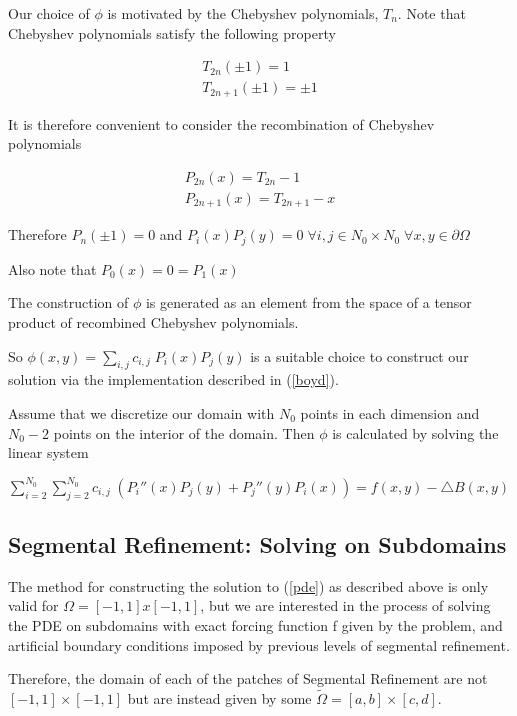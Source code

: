 \documentclass[final]{siamart1116}
\numberwithin{theorem}{section}
\begin{document}
Our choice of $\phi$ is motivated by the Chebyshev polynomials, $T_n$. Note that Chebyshev polynomials satisfy the following property

\begin{align*}
T_{2n}(\pm 1) = 1 \\
T_{2n+1}(\pm 1) = \pm 1
\end{align*}

It is therefore convenient to consider the recombination of Chebyshev polynomials

\begin{align*}
P_{2n}(x) = T_{2n} - 1 \\
P_{2n+1}(x) =  T_{2n+1} - x 
\end{align*}

Therefore $P_{n}(\pm 1) = 0$ and $P_i (x) P_j(y) = 0 \;  \forall  i, j \in N_0 \times N_0 \; \forall x, y \in \partial \Omega $

Also note that $P_0(x) = 0 = P_1(x)$

The construction of $\phi$ is generated as an element from the space of a tensor product of recombined Chebyshev polynomials. 

So $\phi(x, y) = \sum_{i, j} c_{i, j} \; P_i (x) P_j(y) $ is a suitable choice to construct our solution via the implementation described in (\ref{boyd}). 

Assume that we discretize our domain with $N_0$ points in each dimension and $N_0-2$ points on the interior of the domain. Then $\phi$ is calculated by solving the linear system 

$ \sum_{i = 2}^{N_0} \sum_{j = 2}^{N_0}  c_{i, j} \; (P_i'' (x) P_j (y) + P_j''(y) P_i (x)) = f(x, y) - \bigtriangleup B(x, y)$




\subsection{Segmental Refinement: Solving on Subdomains}
The method for constructing the solution to (\ref{pde}) as described above is only valid for $\Omega = [-1, 1] x [-1, 1]$, but we are interested in the process of solving the PDE on subdomains with exact forcing function f given by the problem, and artificial boundary conditions imposed by previous levels of segmental refinement.  

Therefore, the domain of each of the patches of Segmental Refinement are not $[-1, 1] \times [-1, 1]$ but are instead given by some $\tilde{\Omega} = [a, b] \times [c, d]$.
\end{document}
